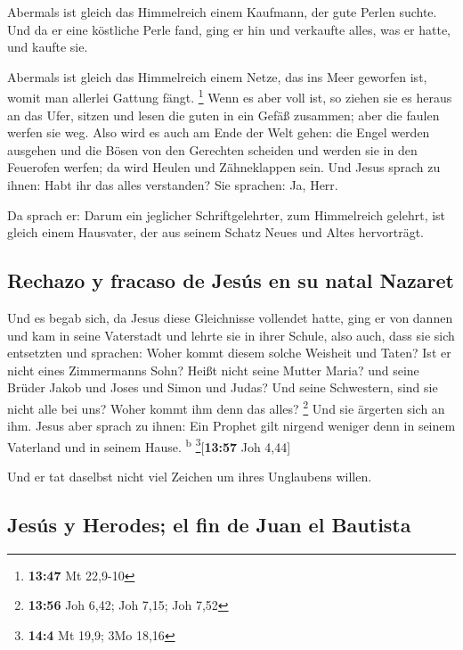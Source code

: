  Abermals ist gleich das Himmelreich einem Kaufmann, der
gute Perlen suchte.  Und da er eine köstliche Perle fand,
ging er hin und verkaufte alles, was er hatte, und kaufte sie.

 Abermals ist gleich das Himmelreich einem Netze, das ins
Meer geworfen ist, womit man allerlei Gattung fängt. \footnote{\textbf{13:47}
  Mt 22,9-10}  Wenn es aber voll ist, so ziehen sie es
heraus an das Ufer, sitzen und lesen die guten in ein Gefäß zusammen;
aber die faulen werfen sie weg.  Also wird es auch am
Ende der Welt gehen: die Engel werden ausgehen und die Bösen von den
Gerechten scheiden  und werden sie in den Feuerofen
werfen; da wird Heulen und Zähneklappen sein.  Und Jesus
sprach zu ihnen: Habt ihr das alles verstanden? Sie sprachen: Ja, Herr.

 Da sprach er: Darum ein jeglicher Schriftgelehrter, zum
Himmelreich gelehrt, ist gleich einem Hausvater, der aus seinem Schatz
Neues und Altes hervorträgt.

\hypertarget{rechazo-y-fracaso-de-jesuxfas-en-su-natal-nazaret}{%
\subsection{Rechazo y fracaso de Jesús en su natal
Nazaret}\label{rechazo-y-fracaso-de-jesuxfas-en-su-natal-nazaret}}

 Und es begab sich, da Jesus diese Gleichnisse vollendet
hatte, ging er von dannen  und kam in seine Vaterstadt
und lehrte sie in ihrer Schule, also auch, dass sie sich entsetzten und
sprachen: Woher kommt diesem solche Weisheit und Taten? 
Ist er nicht eines Zimmermanns Sohn? Heißt nicht seine Mutter Maria? und
seine Brüder Jakob und Joses und Simon und Judas?  Und
seine Schwestern, sind sie nicht alle bei uns? Woher kommt ihm denn das
alles? \footnote{\textbf{13:56} Joh 6,42; Joh 7,15; Joh 7,52}
 Und sie ärgerten sich an ihm. Jesus aber sprach zu
ihnen: Ein Prophet gilt nirgend weniger denn in seinem Vaterland und in
seinem Hause. \textsuperscript{b} \footnote{\textbf{14:4} Mt 19,9; 3Mo
  18,16}{[}\textbf{13:57} Joh 4,44{]}

 Und er tat daselbst nicht viel Zeichen um ihres
Unglaubens willen.

\hypertarget{jesuxfas-y-herodes-el-fin-de-juan-el-bautista}{%
\subsection{Jesús y Herodes; el fin de Juan el
Bautista}\label{jesuxfas-y-herodes-el-fin-de-juan-el-bautista}}

